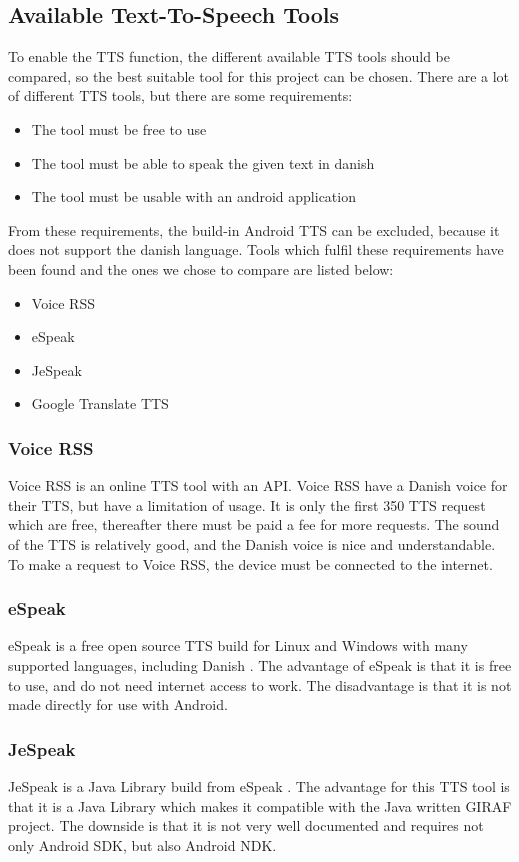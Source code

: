 \subsection{Available Text-To-Speech Tools}
\label{sec:ttstool}
To enable the TTS function, the different available TTS tools should be compared, so the best suitable tool for this project can be chosen.
There are a lot of different TTS tools, but there are some requirements:
\begin{itemize}
	\item The tool must be free to use
	\item The tool must be able to speak the given text in danish
	\item The tool must be usable with an android application
\end{itemize}
From these requirements, the build-in Android TTS can be excluded, because it does not support the danish language.
Tools which fulfil these requirements have been found and the ones we chose to compare are listed below:
\begin{itemize}
	\item Voice RSS
	\item eSpeak
	\item JeSpeak
	\item Google Translate TTS
\end{itemize}

\subsubsection{Voice RSS}
Voice RSS \citep{voicerss} is an online TTS tool with an API. Voice RSS have a Danish voice for their TTS, but have a limitation of usage. It is only the first 350 TTS request which are free, thereafter there must be paid a fee for more requests. The sound of the TTS is relatively good, and the Danish voice is nice and understandable. To make a request to Voice RSS, the device must be connected to the internet.

\subsubsection{eSpeak}
eSpeak is a free open source TTS build for Linux and Windows with many supported languages, including Danish \citep{espeak}. The advantage of eSpeak is that it is free to use, and do not need internet access to work. The disadvantage is that it is not made directly for use with Android. 

\subsubsection{JeSpeak}
JeSpeak is a Java Library build from eSpeak \citep{jespeak}. The advantage for this TTS tool is that it is a Java Library which makes it compatible with the Java written GIRAF project. The downside is that it is not very well documented and requires not only Android SDK, but also Android NDK.


